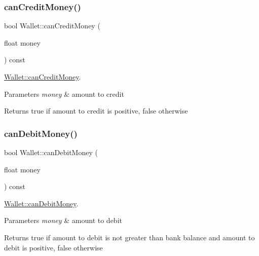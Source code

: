 \subsubsection{\texorpdfstring{can\+Credit\+Money()}{canCreditMoney()}}
{\footnotesize\ttfamily bool Wallet\+::can\+Credit\+Money (\begin{DoxyParamCaption}\item[{float}]{money }\end{DoxyParamCaption}) const}



\hyperlink{classWallet_a69b488bc31201592bb860b6fdaafa1b8}{Wallet\+::can\+Credit\+Money}. 


\begin{DoxyParams}{Parameters}
{\em money} & amount to credit \\
\hline
\end{DoxyParams}
\begin{DoxyReturn}{Returns}
true if amount to credit is positive, false otherwise 
\end{DoxyReturn}
\mbox{\label{classWallet_a1583a38c87dd04ecd5854f15590e170d}} 
\subsubsection{\texorpdfstring{can\+Debit\+Money()}{canDebitMoney()}}
{\footnotesize\ttfamily bool Wallet\+::can\+Debit\+Money (\begin{DoxyParamCaption}\item[{float}]{money }\end{DoxyParamCaption}) const}



\hyperlink{classWallet_a1583a38c87dd04ecd5854f15590e170d}{Wallet\+::can\+Debit\+Money}. 


\begin{DoxyParams}{Parameters}
{\em money} & amount to debit \\
\hline
\end{DoxyParams}
\begin{DoxyReturn}{Returns}
true if amount to debit is not greater than bank balance and amount to debit is positive, false otherwise 
\end{DoxyReturn}
\mbox{\label{classWallet_ab9354b0a8250c0f21b867cc725a33e1e}} 
